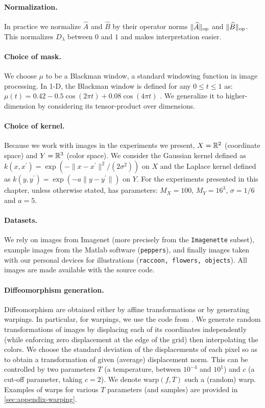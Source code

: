 \paragraph{Normalization.}
In practice we normalize $\widehat A$ and $\widehat B$ by their operator norms $\lVert{\widehat A}\rVert_{\mathrm{op}}$ and $\lVert{\widehat B}\rVert_{\mathrm{op}}$. This normalizes $D_\lambda$ between $0$ and $1$ and makes interpretation easier.

\paragraph{Choice of mask.}
We choose $\mu$ to be a Blackman window, a standard windowing function in image processing. In 1-D, the Blackman window is defined for any $0 \leq t \leq 1$ as:
$\mu(t) = 0.42 - 0.5\cos(2\pi t) + 0.08 \cos(4\pi t)$ \cite{oppenheim99}.
We generalize it to higher-dimension by considering its tensor-product over dimensions.

\paragraph{Choice of kernel.}
Because we work with images in the experiments we present, $X = \mathbb R^2$ (coordinate space) and $Y = \mathbb R^3$ (color space). We consider the Gaussian kernel defined as $k(x, x^\prime) = \exp(- \|x - x^\prime\|^2/(2\sigma^2))$ on $X$ and the Laplace kernel defined as $k(y, y^\prime) = \exp(-a \| y - y^\prime \|)$ on $Y$. For the experiments presented in this chapter, unless otherwise stated, \Diffy has parameters: $M_X = 100$, $M_Y = 16^3$, $\sigma = 1/6$ and $a=5$.

\paragraph{Datasets.}
We rely on images from Imagenet (more precisely from the \texttt{Imagenette} subset), example images from the Matlab software (\texttt{peppers}), and finally images taken with our personal devices for illustrations (\texttt{raccoon, flowers, objects}). All images are made available with the source code.

\paragraph{Diffeomorphism generation.} Diffeomorphism are obtained either by affine transformations or by generating warpings. In particular, for warpings, we use the code from \cite{wyartdiffeo}. We generate random transformations of images by displacing each of its coordinates independently (while enforcing zero displacement at the edge of the grid) then interpolating the colors.  We choose the standard deviation of the displacements of each pixel so as to obtain a transformation of given (average) displacement norm. This can be controlled by two parameters $T$ (a temperature, between $10^{-4}$ and $10^1$) and $c$ (a cut-off parameter, taking $c=2$). We denote $\text{warp}(f, T)$ such a (random) warp. Examples of warps for various $T$ parameters (and samples) are provided in \cref{sec:appendix-warping}.

